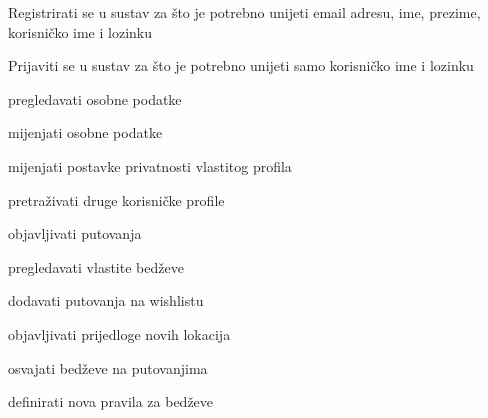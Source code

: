 			
			\begin{packed_enum}
				\item  {}
				
				\begin{packed_enum}
					
					\item Registrirati se u sustav za što je potrebno unijeti email adresu, ime, prezime, korisničko ime i lozinku 
					\item Prijaviti se u sustav za što je potrebno unijeti samo korisničko ime i lozinku
					
				\end{packed_enum}
			
				\item  {}
				
				\begin{packed_enum}
					
					\item pregledavati osobne podatke
					\item mijenjati osobne podatke
					\item mijenjati postavke privatnosti vlastitog profila
					\item pretraživati druge korisničke profile
					\item objavljivati putovanja
					\item pregledavati vlastite bedževe
					\item dodavati putovanja na wishlistu
					\item objavljivati prijedloge novih lokacija
					\item osvajati bedževe na putovanjima
					
				\end{packed_enum}
				
				\item  {}
				
				\begin{packed_enum}
					
					\item definirati nova pravila za bedževe
					
				\end{packed_enum}
				
				\item  {}
				
				\begin{packed_enum}
					

\end{packed_enum}
\end{packed_enum}
